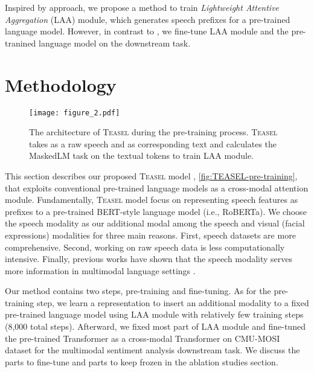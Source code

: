 \documentclass[letterpaper]{article} \usepackage{spconf,amsmath,graphicx}
\newcommand{\teasel}{\textsc{Teasel }}
\begin{document}
Inspired by \cite{tsimpoukelli2021multimodal} approach, we propose a method to train \textit{Lightweight Attentive Aggregation} (LAA) module, which generates speech prefixes for a pre-trained language model. However, in contrast to \cite{tsimpoukelli2021multimodal}, we fine-tune LAA module and the pre-tranined language model on the downstream task.











\section{Methodology}
\label{sec:methodolody}


\begin{figure}[t]
\centering
\texttt{[image: figure\_2.pdf]} \caption{The architecture of \teasel during the pre-training process. \teasel takes  as a raw speech and  as corresponding text and calculates the MaskedLM task on the textual tokens to train LAA module.}
\label{fig:TEASEL-pre-training}
\end{figure}


This section describes our proposed \teasel model , \autoref{fig:TEASEL-pre-training}, that exploits conventional pre-trained language models as a cross-modal attention module. Fundamentally, \teasel model focus on representing speech features as prefixes to a pre-trained BERT-style language model (i.e., RoBERTa). We choose the speech modality as our additional modal among the speech and visual (facial expressions) modalities for three main reasons. First, speech datasets are more comprehensive. Second, working on raw speech data is less computationally intensive. Finally, previous works have shown that the speech modality serves more information in multimodal language settings \cite{tsai2019MULT, yu2021le}. 


Our method contains two steps, pre-training and fine-tuning. As for the pre-training step, we learn a representation to insert an additional modality to a fixed pre-trained language model using LAA module with relatively few training steps (8,000 total steps). Afterward, we fixed most part of LAA module and fine-tuned the pre-trained Transformer as a cross-modal Transformer on CMU-MOSI dataset for the multimodal sentiment analysis downstream task. We discuss the parts to fine-tune and parts to keep frozen in the ablation studies section.
\end{document}

